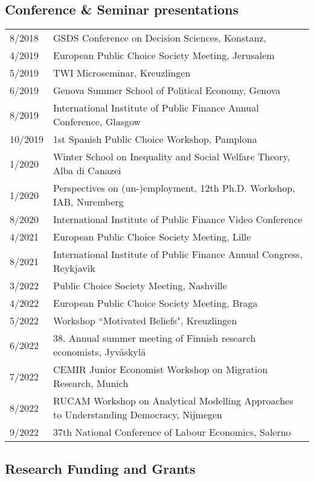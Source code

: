 \documentclass[16pt]{article}
\begin{document}
\subsection*{Conference \& Seminar presentations}
\begin{tabular}{@{}p{1.5in}p{5in}}
8/2018             & GSDS Conference on Decision Sciences, Konstanz,\\
4/2019             & European Public Choice Society Meeting, Jerusalem\\
5/2019             & TWI Microseminar, Kreuzlingen \\
6/2019             & Genova Summer School of Political Economy, Genova \\
8/2019             & International Institute of Public Finance Annual Conference, Glasgow \\
10/2019           & 1st Spanish Public Choice Workshop, Pamplona \\
1/2020             & Winter School on Inequality and Social Welfare Theory, Alba di Canazei \\
1/2020             & Perspectives on (un-)employment, 12th Ph.D. Workshop, IAB, Nuremberg \\
8/2020             & International Institute of Public Finance Video Conference \\
4/2021             & European Public Choice Society Meeting, Lille \\
8/2021             & International Institute of Public Finance Annual Congress, Reykjavik \\
3/2022             & Public Choice Society Meeting, Nashville \\
4/2022             & European Public Choice Society Meeting, Braga \\
5/2022             & Workshop ``Motivated Beliefs", Kreuzlingen \\
6/2022             & 38. Annual summer meeting of Finnish research economists, Jyväskylä \\
7/2022             & CEMIR Junior Economist Workshop on Migration Research, Munich \\
8/2022             & RUCAM Workshop on Analytical Modelling Approaches to Understanding Democracy, Nijmegen \\
9/2022             &  37th National Conference of Labour Economics, Salerno
\end{tabular}

\subsection*{Research Funding and Grants}
\end{document}
